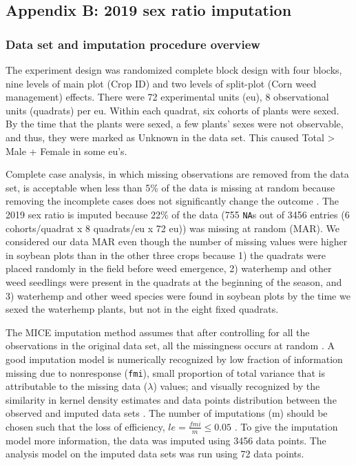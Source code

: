 \documentclass[
]{article}
\author{}
\date{\vspace{-2.5em}}
\begin{document}
\hypertarget{appendix-b-2019-sex-ratio-imputation}{%
\subsection*{Appendix B: 2019 sex ratio imputation}\label{appendix-b-2019-sex-ratio-imputation}}

\hypertarget{data-set-and-imputation-procedure-overview}{%
\subsubsection*{Data set and imputation procedure overview}\label{data-set-and-imputation-procedure-overview}}

The experiment design was randomized complete block design with four blocks, nine levels of main plot (Crop ID) and two levels of split-plot (Corn weed management) effects. There were 72 experimental units (eu), 8 observational units (quadrats) per eu. Within each quadrat, six cohorts of plants were sexed. By the time that the plants were sexed, a few plants' sexes were not observable, and thus, they were marked as Unknown in the data set. This caused Total \textgreater{} Male + Female in some eu's.

Complete case analysis, in which missing observations are removed from the data set, is acceptable when less than 5\% of the data is missing at random because removing the incomplete cases does not significantly change the outcome \citep{azurMultipleImputationChained2011}. The 2019 sex ratio is imputed because 22\% of the data (755 \texttt{NA}s out of 3456 entries (6 cohorts/quadrat x 8 quadrats/eu x 72 eu)) was missing at random (MAR). We considered our data MAR even though the number of missing values were higher in soybean plots than in the other three crops because 1) the quadrats were placed randomly in the field before weed emergence, 2) waterhemp and other weed seedlings were present in the quadrats at the beginning of the season, and 3) waterhemp and other weed species were found in soybean plots by the time we sexed the waterhemp plants, but not in the eight fixed quadrats.

The MICE imputation method assumes that after controlling for all the observations in the original data set, all the missingness occurs at random \citep{vanbuurenMiceMultivariateImputation2011}. A good imputation model is numerically recognized by low fraction of information missing due to nonresponse (\texttt{fmi}), small proportion of total variance that is attributable to the missing data (\(\lambda\)) values; and visually recognized by the similarity in kernel density estimates and data points distribution between the observed and imputed data sets \citep{vanbuurenMiceMultivariateImputation2011}. The number of imputations (m) should be chosen such that the loss of efficiency, \(le = \frac{fmi}{m} \leq 0.05\) \citep{whiteMultipleImputationUsing2011}. To give the imputation model more information, the data was imputed using 3456 data points. The analysis model on the imputed data sets was run using 72 data points.
\end{document}
